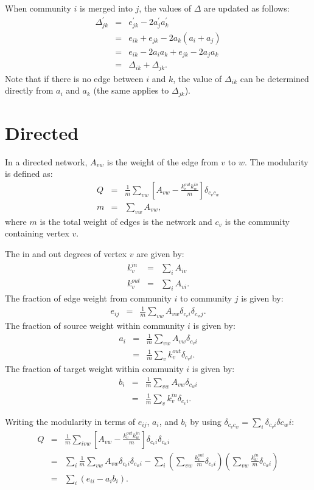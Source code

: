 \documentclass{article}
\newcommand{\beq}{\begin{eqnarray}}
\newcommand{\eeq}{\end{eqnarray}}
\begin{document}
When community $i$ is merged into $j$, the values of $\Delta$ are updated
as follows:
\beq
\Delta^\prime_{jk} &=& e_{jk}^\prime - 2 a_j^\prime a_k^\prime \\
&=& e_{ik} + e_{jk} - 2 a_k ( a_i + a_j) \\
&=& e_{ik} - 2 a_i a_k + e_{jk} - 2 a_j a_k \\
&=& \Delta_{ik} + \Delta_{jk}.
\eeq
Note that if there is no edge between $i$ and $k$,
the value of $\Delta_{ik}$ can be determined directly from $a_i$ and $a_k$
(the same applies to $\Delta_{jk}$).


\section{Directed}
In a directed network, $A_{vw}$ is the weight of the edge from $v$ to $w$.
The modularity is defined as:
\beq
\label{eq:modularity} Q &=& \frac{1}{m} \sum_{vw} \left[ A_{vw} - \frac{k_v^{out} k_w^{in}}{m} \right]\delta_{c_v c_w} \\
m &=& \sum_{vw} A_{vw},
\eeq
where $m$ is the total weight of edges is the network and $c_v$ is the community containing vertex $v$.

The in and out degrees of vertex $v$ are given by:
\beq
k_v^{in} &=& \sum_i A_{iv} \\
k_v^{out} &=& \sum_i A_{vi}.
\eeq
The fraction of edge weight from community $i$ to community $j$ is given by:
\beq
e_{ij} &=& \frac{1}{m}\sum_{vw} A_{vw} \delta_{c_vi}\delta_{c_wj}.
\eeq
The fraction of source weight within community $i$ is given by:
\beq
a_i &=& \frac{1}{m}\sum_{vw}A_{vw} \delta_{c_vi} \\
&=& \frac{1}{m}\sum_v k_v^{out} \delta_{c_vi}.
\eeq
The fraction of target weight within community $i$ is given by:
\beq
b_i &=& \frac{1}{m}\sum_{vw}A_{vw} \delta_{c_wi} \\
&=& \frac{1}{m}\sum_v k_v^{in} \delta_{c_vi}.
\eeq

Writing the modularity in terms of $e_{ij}$, $a_i$, and $b_i$ by using
$\delta_{c_vc_w} = \sum_i \delta_{c_vi}\delta{c_wi}$:
\beq
Q &=& \frac{1}{m} \sum_{ivw} \left[ A_{vw} - \frac{k_v^{out} k_w^{in}}{m} \right]\delta_{c_v i}\delta_{c_w i} \\
&=& \sum_i \frac{1}{m} \sum_{vw}A_{vw}\delta_{c_v i}\delta_{c_w i}
- \sum_i \left(\sum_{vw} \frac{k_v^{out}}{m}\delta_{c_v i} \right)
\left(\sum_{vw} \frac{k_w^{in}}{m}\delta_{c_w i} \right) \\
&=& \sum_i \left( e_{ii} - a_ib_i \right).
\eeq
\end{document}
